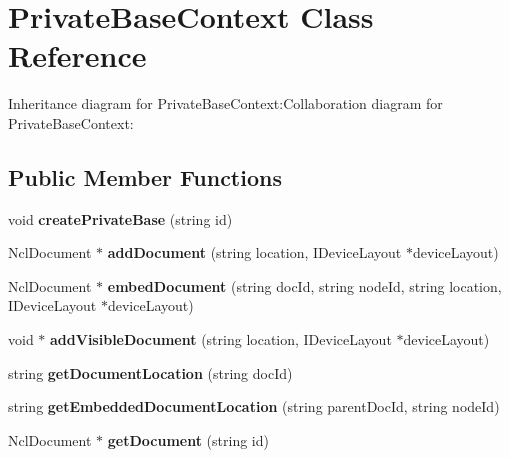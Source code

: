 \section{PrivateBaseContext Class Reference}
\label{classbr_1_1pucrio_1_1telemidia_1_1ginga_1_1ncl_1_1PrivateBaseContext}
Inheritance diagram for PrivateBaseContext:Collaboration diagram for PrivateBaseContext:\subsection*{Public Member Functions}
\begin{CompactItemize}
\item 
void \textbf{createPrivateBase} (string id)\label{classbr_1_1pucrio_1_1telemidia_1_1ginga_1_1ncl_1_1PrivateBaseContext_0dce35539707ed546bc00c8c0ad63cb3}

\item 
NclDocument $\ast$ \textbf{addDocument} (string location, IDeviceLayout $\ast$deviceLayout)\label{classbr_1_1pucrio_1_1telemidia_1_1ginga_1_1ncl_1_1PrivateBaseContext_36facb1f9b268086261cb6832fb922e4}

\item 
NclDocument $\ast$ \textbf{embedDocument} (string docId, string nodeId, string location, IDeviceLayout $\ast$deviceLayout)\label{classbr_1_1pucrio_1_1telemidia_1_1ginga_1_1ncl_1_1PrivateBaseContext_119635f92ccfb42cac0ed9a615b31b78}

\item 
void $\ast$ \textbf{addVisibleDocument} (string location, IDeviceLayout $\ast$deviceLayout)\label{classbr_1_1pucrio_1_1telemidia_1_1ginga_1_1ncl_1_1PrivateBaseContext_7d0478e2d967cf7afcba3ee494669d1b}

\item 
string \textbf{getDocumentLocation} (string docId)\label{classbr_1_1pucrio_1_1telemidia_1_1ginga_1_1ncl_1_1PrivateBaseContext_c949be85812dd5519805b1e0a32d48ff}

\item 
string \textbf{getEmbeddedDocumentLocation} (string parentDocId, string nodeId)\label{classbr_1_1pucrio_1_1telemidia_1_1ginga_1_1ncl_1_1PrivateBaseContext_f049beb565e14cc88b481b0cc8f79fe3}

\item 
NclDocument $\ast$ \textbf{getDocument} (string id)\label{classbr_1_1pucrio_1_1telemidia_1_1ginga_1_1ncl_1_1PrivateBaseContext_75a91eb9d4e16f4115d01caaf636d569}


\end{CompactItemize}
